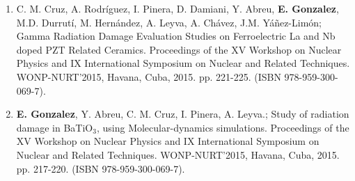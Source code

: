 \documentclass[10pt]{article}
\makeatletter
\newlength{\bibhang}
\newlength{\bibsep}
{\@listi \global\bibsep\itemsep \global\advance\bibsep by\parsep}
\newenvironment{bibsection}%
{\begin{enumerate}{}{%
			\setlength{\leftmargin}{\bibhang}%
			\setlength{\itemindent}{-\leftmargin}%
			\setlength{\itemsep}{\bibsep}%
			\setlength{\parsep}{\z@}%
			\setlength{\partopsep}{0pt}%
	\setlength{\topsep}{0pt}}}
{\end{enumerate}\vspace{-.6\baselineskip}}
\newcommand{\halfblankline}{\quad\vspace{-0.5\baselineskip}\pagebreak[3]}
\makeatother
\begin{document}
\begin{bibsection}
	\item C. M. Cruz, A. Rodr\'iguez, I. Pinera, D. Damiani,  Y. Abreu, {\bf E.
		Gonzalez}, M.D. Durrut\'i, M. Hern\'andez,  A. Leyva, A. Ch\'avez, J.M.
		Y\'a\~nez-Lim\'on; Gamma Radiation Damage Evaluation Studies on
		Ferroelectric La and Nb doped PZT Related Ceramics. Proceedings of the
		XV Workshop on Nuclear Physics and IX International Symposium on
		Nuclear and Related Techniques.  WONP-NURT'2015, Havana, Cuba, 2015.
		pp. 221-225. (ISBN 978-959-300-069-7).


	\item  {\bf E. Gonzalez}, Y. Abreu, C. M. Cruz, I. Pinera, A. Leyva.; Study
		of radiation damage in BaTiO$_3$, using Molecular-dynamics
		simulations. Proceedings of the XV Workshop on Nuclear Physics and
		IX International Symposium on Nuclear and Related Techniques.
		WONP-NURT'2015, Havana, Cuba, 2015. pp. 217-220. (ISBN
		978-959-300-069-7).



	\end{bibsection}

	\halfblankline
\end{document}
